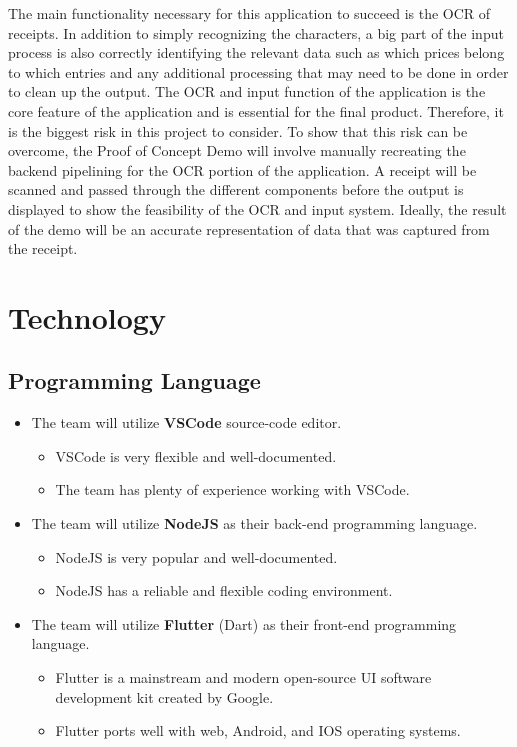 \documentclass{article}
\begin{document}
The main functionality necessary for this application to succeed is the OCR of receipts.
In addition to simply recognizing the characters, a big part of the input
process is also correctly identifying the relevant data such as which prices belong to which entries and any additional
processing that may need to be done in order to clean up the output. 
The OCR and input function of the application is the core feature of the application and is essential for the final product.
Therefore, it is the biggest risk in this project to consider. 
To show that this risk can be overcome, the Proof of Concept Demo will involve manually recreating the backend
pipelining for the OCR portion of the application. A receipt will be scanned and passed through the different
components before the output is displayed to show the feasibility of the OCR and input system.
Ideally, the result of the demo will be an accurate representation of data that was captured from the receipt.

\section{Technology}

\subsection{Programming Language}
    \begin{itemize}
        \item The team will utilize \textbf{VSCode} source-code editor.
        \begin{itemize}
            \item VSCode is very flexible and well-documented.
            \item The team has plenty of experience working with VSCode.
        \end{itemize}
        \item The team will utilize \textbf{NodeJS} as their back-end programming language.
        \begin{itemize}
            \item NodeJS is very popular and well-documented.
            \item NodeJS has a reliable and flexible coding environment.
        \end{itemize}
        \item The team will utilize \textbf{Flutter} (Dart) as their front-end programming language.
        \begin{itemize}
            \item Flutter is a mainstream and modern open-source UI software development kit created by Google.
            \item Flutter ports well with web, Android, and IOS operating systems.
        \end{itemize}
    \end{itemize}
\end{document}

